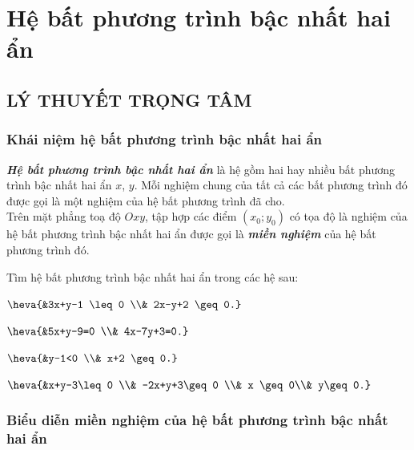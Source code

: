 \section{Hệ bất phương trình bậc nhất hai ẩn}
\subsection{LÝ THUYẾT TRỌNG TÂM}
\subsubsection{Khái niệm hệ bất phương trình bậc nhất hai ẩn}

\begin{lt}
	\textbf{\textit{Hệ bất phương trình bậc nhất hai ẩn}} là hệ gồm hai hay nhiều bất phương trình bậc nhất hai ẩn $x$, $y$. Mỗi nghiệm chung của tất cả các bất phương trình đó được gọi là một nghiệm của hệ bất phương trình đã cho.\\
	Trên mặt phẳng toạ độ $Oxy$, tập hợp các điểm $(x_0;y_0)$ có tọa độ là nghiệm của hệ bất phương trình bậc nhất hai ẩn được gọi là \textbf{\textit{miền nghiệm}} của hệ bất phương trình đó.
\end{lt}

\begin{vd}
	Tìm hệ bất phương trình bậc nhất hai ẩn trong các hệ sau:
	\begin{listEX}[4]
		\item $\heva{&3x+y-1 \leq 0 \\& 2x-y+2 \geq 0.}$
		\item $\heva{&5x+y-9=0 \\& 4x-7y+3=0.}$
		\item $\heva{&y-1<0 \\& x+2 \geq 0.}$
		\item $\heva{&x+y-3\leq 0 \\& -2x+y+3\geq 0 \\& x \geq 0\\& y\geq 0.}$
	\end{listEX}
\end{vd}

\subsubsection{Biểu diễn miền nghiệm của hệ bất phương trình bậc nhất hai ẩn}

